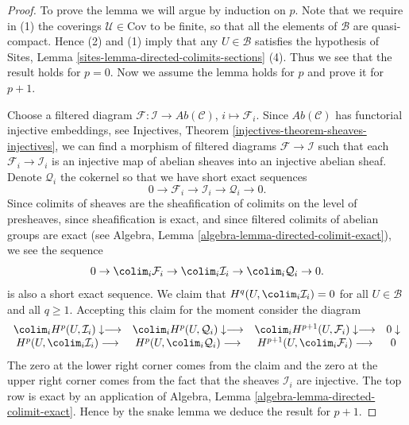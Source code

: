 \begin{proof}
To prove the lemma we will argue by induction on $p$.
Note that we require in (1) the coverings $\mathcal{U} \in \text{Cov}$
to be finite, so that all the elements of $\mathcal{B}$ are quasi-compact.
Hence (2) and (1) imply that any $U \in \mathcal{B}$ satisfies the hypothesis
of Sites, Lemma \ref{sites-lemma-directed-colimits-sections} (4).
Thus we see that the result holds for $p = 0$.
Now we assume the lemma holds for $p$ and prove it for $p + 1$.

\medskip\noindent
Choose a filtered diagram
$\mathcal{F} : \mathcal{I} \to \textit{Ab}(\mathcal{C})$,
$i \mapsto \mathcal{F}_i$.
Since $\textit{Ab}(\mathcal{C})$ has functorial injective embeddings, see
Injectives, Theorem \ref{injectives-theorem-sheaves-injectives},
we can find a morphism of filtered diagrams
$\mathcal{F} \to \mathcal{I}$
such that each $\mathcal{F}_i \to \mathcal{I}_i$ is an injective map of
abelian sheaves into an injective abelian sheaf. Denote $\mathcal{Q}_i$
the cokernel so that we have short exact sequences
$$
0 \to
\mathcal{F}_i \to
\mathcal{I}_i \to
\mathcal{Q}_i \to 0.
$$
Since colimits of sheaves are the sheafification of colimits on the level
of presheaves, since sheafification is exact, and since filtered
colimits of abelian groups are exact
(see Algebra, Lemma \ref{algebra-lemma-directed-colimit-exact}),
we see the sequence
$$
0 \to
\colim_i \mathcal{F}_i \to
\colim_i \mathcal{I}_i \to
\colim_i \mathcal{Q}_i \to 0.
$$
is also a short exact sequence. We claim that
$H^q(U, \colim_i \mathcal{I}_i) = 0$ for all $U \in \mathcal{B}$
and all $q \geq 1$. Accepting this claim
for the moment consider the diagram
$$
\begin{array}{cccc}\colim_i H^p(U, \mathcal{I}_i) \downarrow\longrightarrow & \colim_i H^p(U, \mathcal{Q}_i) \downarrow\longrightarrow & \colim_i H^{p + 1}(U, \mathcal{F}_i) \downarrow\longrightarrow & 0 \downarrow \\ H^p(U, \colim_i \mathcal{I}_i) \longrightarrow & H^p(U, \colim_i \mathcal{Q}_i) \longrightarrow & H^{p + 1}(U, \colim_i \mathcal{F}_i) \longrightarrow & 0\end{array}
$$
The zero at the lower right corner comes from the claim and the
zero at the upper right corner comes from the fact that the sheaves
$\mathcal{I}_i$ are injective.
The top row is exact by an application of
Algebra, Lemma \ref{algebra-lemma-directed-colimit-exact}.
Hence by the snake lemma we deduce the
result for $p + 1$.


\end{proof}
